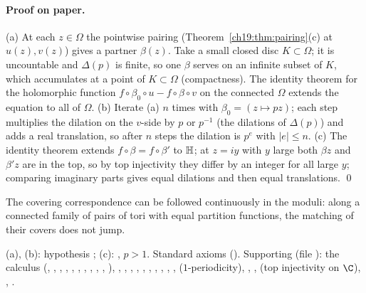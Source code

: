 \paragraph{Proof on paper.}  (a) At each $z\in\Omega$ the pointwise pairing (Theorem~\ref{ch19:thm:pairing}(c) at $u(z),v(z)$) gives a
partner $\beta(z)$.  Take a small closed disc $K\subset\Omega$; it is uncountable and $\Delta(p)$ is finite, so one $\beta$ serves on an
infinite subset of $K$, which accumulates at a point of $K\subset\Omega$ (compactness).  The identity theorem for the holomorphic
function $f\circ\beta_0\circ u-f\circ\beta\circ v$ on the connected $\Omega$ extends the equation to all of $\Omega$.  (b) Iterate (a) $n$ times
with $\beta_0=(z\mapsto pz)$; each step multiplies the dilation on the $v$-side by $p$ or $p^{-1}$ (the dilations of $\Delta(p)$) and adds a
real translation, so after $n$ steps the dilation is $p^e$ with $|e|\le n$.  (c) The identity theorem extends $f\circ\beta=f\circ\beta'$
to $\mathbb{H}$; at $z=iy$ with $y$ large both $\beta z$ and $\beta'z$ are in the top, so by top injectivity they differ by an
integer for all large $y$; comparing imaginary parts gives equal dilations and then equal translations. \qed
\begin{physics}The covering correspondence can be followed continuously in the moduli: along a connected family of pairs
of tori with equal partition functions, the matching of their covers does not jump.\end{physics}
\begin{status}(a), (b): hypothesis ; (c): , $p>1$.  Standard axioms
().  Supporting (file ): the
 calculus (, , , , ,
, , , , ,
), , , , ,
, , , ,
, ,  ($1$-periodicity),
, ,  (top injectivity on $\C$),
, .\end{status}

